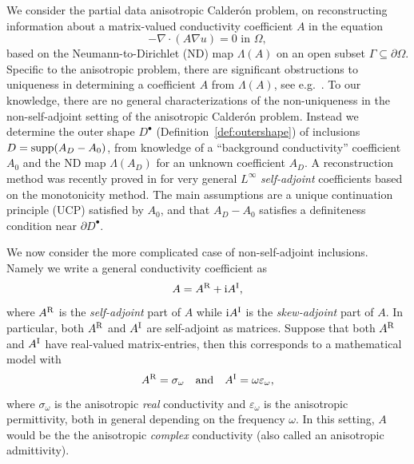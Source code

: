 \documentclass[reqno]{amsart}
\numberwithin{equation}{section}
\numberwithin{figure}{section}
\numberwithin{table}{section}
\theoremstyle{plain}
\theoremstyle{definition}
\theoremstyle{remark}
\newcommand{\suppm}{\mathop{\textup{supp}}}
\newcommand{\I}{\mathrm{i}}    %
\newcommand{\upR}{^{\textup{R}}}
\newcommand{\upI}{^{\textup{I}}}
\newcommand{\AR}{A\upR}
\newcommand{\AI}{A\upI}
\begin{document}
	We consider the partial data anisotropic Calder\'on problem, on reconstructing information about a matrix-valued conductivity coefficient $A$ in the equation
	\begin{equation*}
		-\nabla \cdot(A\nabla u) = 0 \text{ in } \Omega,
	\end{equation*}
	based on the Neumann-to-Dirichlet (ND) map $\Lambda(A)$ on an open subset $\Gamma\subseteq \partial\Omega$. Specific to the anisotropic problem, there are significant obstructions to uniqueness in determining a coefficient $A$ from $\Lambda(A)$, see e.g.~\cite{Astala2005,Sylvester1990,Lee1989}. To our knowledge, there are no general characterizations of the non-uniqueness in the non-self-adjoint setting of the anisotropic Calder\'on problem. Instead we determine the outer shape $D^\bullet$ (Definition~\ref{def:outershape}) of inclusions $D = \suppm(A_D-A_0)$, from knowledge of a ``background conductivity'' coefficient $A_0$ and the ND map $\Lambda(A_D)$ for an unknown coefficient $A_D$. A reconstruction method was recently proved in \cite{GJZ2025} for very general $L^\infty$ \emph{self-adjoint} coefficients based on the monotonicity method. The main assumptions are a unique continuation principle (UCP) satisfied by $A_0$, and that $A_D-A_0$ satisfies a definiteness condition near $\partial D^\bullet$.
	
	We now consider the more complicated case of non-self-adjoint inclusions. Namely we write a general conductivity coefficient as
	\begin{equation*}
		A = \AR + \I \AI,
	\end{equation*}   
	where $\AR$ is the \emph{self-adjoint} part of $A$ while $\I\AI$ is the \emph{skew-adjoint} part of $A$. In particular, both $\AR$ and $\AI$ are self-adjoint as matrices. Suppose that both $\AR$ and $\AI$ have real-valued matrix-entries, then this corresponds to a mathematical model with
	\begin{equation*}
		\AR = \sigma_\omega \quad \text{and} \quad \AI = \omega\varepsilon_\omega,
	\end{equation*}
	where $\sigma_\omega$ is the anisotropic \emph{real} conductivity and $\varepsilon_\omega$ is the anisotropic permittivity, both in general depending on the frequency $\omega$. In this setting, $A$ would be the the anisotropic \emph{complex} conductivity (also called an anisotropic admittivity).
	
\end{document}
